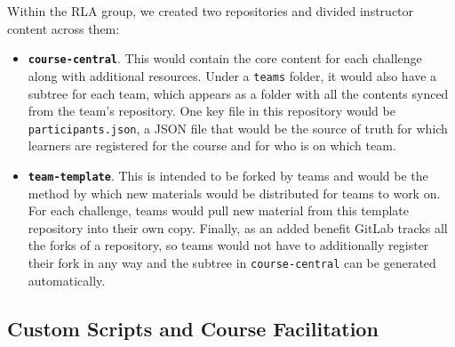 \documentclass[12pt,twoside]{mitthesis}
\begin{document}
{Within the RLA group, we created two repositories and divided instructor content across them:
\begin{itemize}
	\item \textbf{\texttt{course-central}}. This would contain the core content for each challenge along with additional resources. Under a \texttt{teams} folder, it would also have a subtree for each team, which appears as a folder with all the contents synced from the team's repository. One key file in this repository would be \texttt{participants.json}, a JSON file that would be the source of truth for which learners are registered for the course and for who is on which team.
	\item \textbf{\texttt{team-template}}. This is intended to be forked by teams and would be the method by which new materials would be distributed for teams to work on. For each challenge, teams would pull new material from this template repository into their own copy. Finally, as an added benefit GitLab tracks all the forks of a repository, so teams would not have to additionally register their fork in any way and the subtree in \texttt{course-central} can be generated automatically.
\end{itemize}
}

\subsection{Custom Scripts and Course Facilitation}
\end{document}
